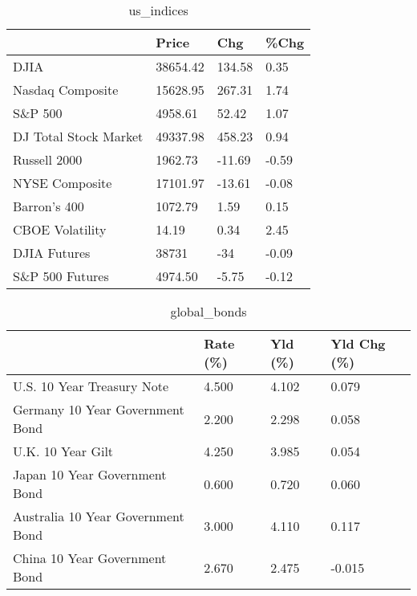 \documentclass{article}%
\begin{document}
%


\begin{table}[htbp]%
\caption{us\_indices}%
\centering%
\begin{adjustbox}{width=1\textwidth}%
\begin{tabular}{llll}
\toprule
                      &    Price &    Chg &  \%Chg \\
\midrule
                 DJIA & 38654.42 & 134.58 &  0.35 \\
     Nasdaq Composite & 15628.95 & 267.31 &  1.74 \\
              S\&P 500 &  4958.61 &  52.42 &  1.07 \\
DJ Total Stock Market & 49337.98 & 458.23 &  0.94 \\
         Russell 2000 &  1962.73 & -11.69 & -0.59 \\
       NYSE Composite & 17101.97 & -13.61 & -0.08 \\
         Barron's 400 &  1072.79 &   1.59 &  0.15 \\
      CBOE Volatility &    14.19 &   0.34 &  2.45 \\
         DJIA Futures &    38731 &    -34 & -0.09 \\
      S\&P 500 Futures &  4974.50 &  -5.75 & -0.12 \\
\bottomrule
\end{tabular}
%
\end{adjustbox}%
\end{table}

%


\begin{table}[htbp]%
\caption{global\_bonds}%
\centering%
\begin{adjustbox}{width=1\textwidth}%
\begin{tabular}{llll}
\toprule
                                  & Rate (\%) & Yld (\%) & Yld Chg (\%) \\
\midrule
       U.S. 10 Year Treasury Note &    4.500 &   4.102 &       0.079 \\
  Germany 10 Year Government Bond &    2.200 &   2.298 &       0.058 \\
                U.K. 10 Year Gilt &    4.250 &   3.985 &       0.054 \\
    Japan 10 Year Government Bond &    0.600 &   0.720 &       0.060 \\
Australia 10 Year Government Bond &    3.000 &   4.110 &       0.117 \\
    China 10 Year Government Bond &    2.670 &   2.475 &      -0.015 \\
\bottomrule
\end{tabular}
%
\end{adjustbox}%
\end{table}
\end{document}
